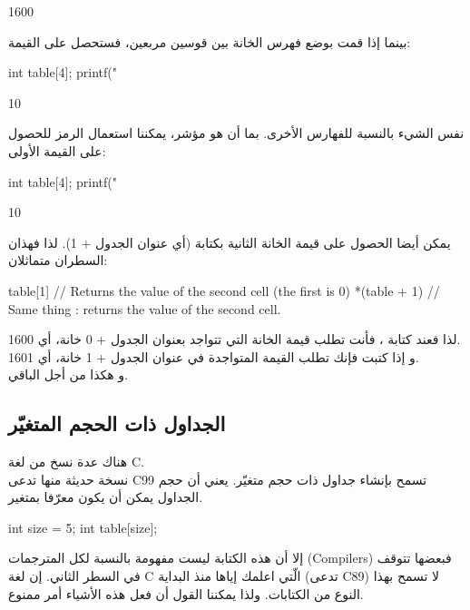 \begin{Console}
1600
\end{Console}

بينما إذا قمت بوضع فهرس الخانة بين قوسين مربعين، فستحصل على القيمة:

\begin{Csource}
int table[4];
printf("%
\end{Csource}

\begin{Console}
10
\end{Console}

نفس الشيء بالنسبة للفهارس الأخرى. بما أن
هو مؤشر، يمكننا استعمال الرمز
\InlineCode{*}
للحصول على القيمة الأولى:

\begin{Csource}
int table[4];
printf("%
\end{Csource}

\begin{Console}
10
\end{Console}

يمكن أيضا الحصول على قيمة الخانة الثانية بكتابة
(أي عنوان الجدول + 1). لذا فهذان السطران متماثلان:

\begin{Csource}
table[1] // Returns the value of the second cell (the first is 0)
*(table + 1) // Same thing : returns the value of the second cell.
\end{Csource}

لذا فعند كتابة
،
فأنت تطلب قيمة الخانة التي تتواجد بعنوان الجدول + 0
خانة، أي 1600.\\
و إذا كتبت
فإنك تطلب القيمة المتواجدة في عنوان الجدول + 1
خانة، أي 1601.\\
و هكذا من أجل الباقي.

\subsection{الجداول ذات الحجم المتغيّر}

هناك عدة نسخ من لغة
\textenglish{C}.\\
نسخة حديثة منها تدعى
\textenglish{C99}
تسمح بإنشاء جداول ذات حجم متغيّر. يعني أن حجم الجداول يمكن أن يكون معرّفا بمتغير.

\begin{Csource}
int size = 5;
int table[size];
\end{Csource}

إلا أن هذه الكتابة ليست مفهومة بالنسبة لكل المترجمات
(\textenglish{Compilers})
فبعضها تتوقف في السطر الثاني. إن لغة
\textenglish{C}
الّتي اعلمك إياها منذ البداية (تدعى
\textenglish{C89})
لا تسمح بهذا النوع من الكتابات. ولذا يمكننا القول أن فعل هذه الأشياء أمر ممنوع.

